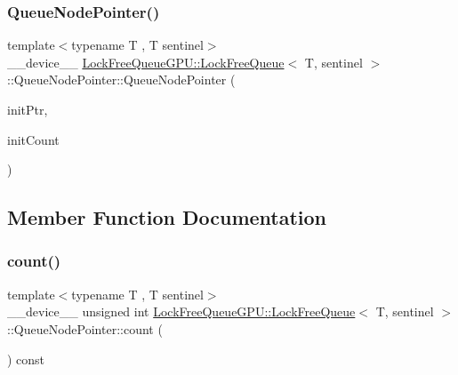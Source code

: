 \subsubsection{\texorpdfstring{Queue\+Node\+Pointer()}{QueueNodePointer()}\hspace{0.1cm}{\footnotesize\ttfamily [3/3]}}
{\footnotesize\ttfamily template$<$typename T , T sentinel$>$ \\
\+\_\+\+\_\+device\+\_\+\+\_\+ \mbox{\hyperlink{class_lock_free_queue_g_p_u_1_1_lock_free_queue}{Lock\+Free\+Queue\+G\+P\+U\+::\+Lock\+Free\+Queue}}$<$ T, sentinel $>$\+::Queue\+Node\+Pointer\+::\+Queue\+Node\+Pointer (\begin{DoxyParamCaption}\item[{\mbox{\hyperlink{class_lock_free_queue_g_p_u_1_1_lock_free_queue_1_1_queue_node}{Queue\+Node}} $\ast$}]{init\+Ptr,  }\item[{const unsigned int}]{init\+Count }\end{DoxyParamCaption})\hspace{0.3cm}{\ttfamily [inline]}}



\subsection{Member Function Documentation}
\mbox{\label{class_lock_free_queue_g_p_u_1_1_lock_free_queue_1_1_queue_node_pointer_a44656a2bd6b73d9b9028f63b49806bb4}} 
\subsubsection{\texorpdfstring{count()}{count()}}
{\footnotesize\ttfamily template$<$typename T , T sentinel$>$ \\
\+\_\+\+\_\+device\+\_\+\+\_\+ unsigned int \mbox{\hyperlink{class_lock_free_queue_g_p_u_1_1_lock_free_queue}{Lock\+Free\+Queue\+G\+P\+U\+::\+Lock\+Free\+Queue}}$<$ T, sentinel $>$\+::Queue\+Node\+Pointer\+::count (\begin{DoxyParamCaption}{ }\end{DoxyParamCaption}) const\hspace{0.3cm}{\ttfamily [inline]}}

